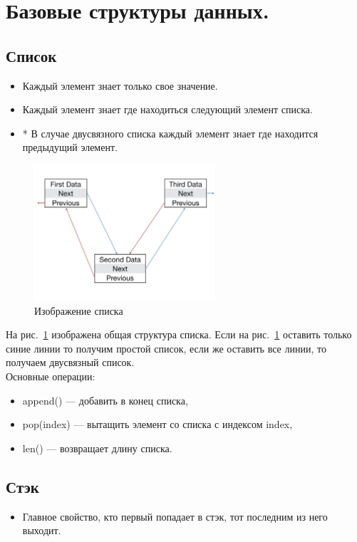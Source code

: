 \section{Базовые структуры данных.}

\subsection{Список}
\begin{itemize}
	\item Каждый элемент знает только свое значение.
	\item Каждый элемент знает где находиться следующий элемент списка.
	\item* В случае двусвязного списка каждый элемент знает где находится предыдущий элемент.
\end{itemize}

\begin{figure}[h!t]\center
\includegraphics[width=0.6\textwidth]{section/section4_1.jpg}
\caption{Изображение списка}
\label{Lecture_4_List}
\end{figure}

На рис.~\ref{Lecture_4_List} изображена общая структура списка. Если на рис.~\ref{Lecture_4_List} оставить только синие линии то получим простой список, если же оставить все линии, то получаем двусвязный список.\\

Основные операции:
\begin{itemize}
	\item append() --- добавить в конец списка,
	\item pop(index)  --- вытащить элемент со списка с индексом index,
	\item len() --- возвращает длину списка.
\end{itemize}

\subsection{Стэк}
\begin{itemize}
	\item Главное свойство, кто первый попадает в стэк, тот последним из него выходит.
\end{itemize}


